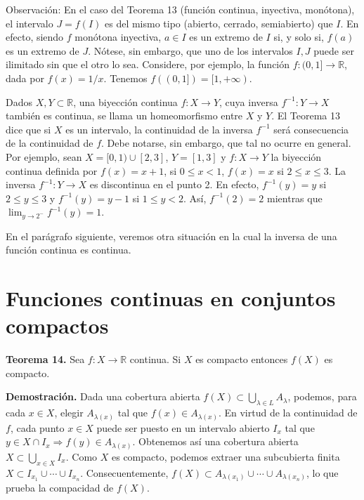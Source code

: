 \documentclass[12pt,oneside]{book}
\begin{document}
Observación: En el caso del Teorema 13 (función continua, inyectiva, monótona), el intervalo \( J = f(I) \) es del mismo tipo (abierto, cerrado, semiabierto) que \( I \). En efecto, siendo \( f \) monótona inyectiva, \( a \in I \) es un extremo de \( I \) si, y solo si, \( f(a) \) es un extremo de \( J \). Nótese, sin embargo, que uno de los intervalos \( I, J \) puede ser ilimitado sin que el otro lo sea. Considere, por ejemplo, la función \( f: (0, 1] \to \mathbb{R} \), dada por \( f(x) = 1/x \). Tenemos \( f((0, 1]) = [1, +\infty) \).

Dados \( X, Y \subset \mathbb{R} \), una biyección continua \( f: X \to Y \), cuya inversa \( f^{-1}: Y \to X \) también es continua, se llama un homeomorfismo entre \( X \) y \( Y \). El Teorema 13 dice que si \( X \) es un intervalo, la continuidad de la inversa \( f^{-1} \) será consecuencia de la continuidad de \( f \). Debe notarse, sin embargo, que tal no ocurre en general. Por ejemplo, sean \( X = [0, 1) \cup [2, 3] \), \( Y = [1, 3] \) y \( f: X \to Y \) la biyección continua definida por \( f(x) = x + 1 \), si \( 0 \leq x < 1 \), \( f(x) = x \) si \( 2 \leq x \leq 3 \). La inversa \( f^{-1}: Y \to X \) es discontinua en el punto 2. En efecto, \( f^{-1}(y) = y \) si \( 2 \leq y \leq 3 \) y \( f^{-1}(y) = y - 1 \) si \( 1 \leq y < 2 \). Así, \( f^{-1}(2) = 2 \) mientras que \( \lim_{y \to 2^-} f^{-1}(y) = 1 \).

En el parágrafo siguiente, veremos otra situación en la cual la inversa de una función continua es continua.

\section{Funciones continuas en conjuntos compactos}

\textbf{Teorema 14.} Sea \( f: X \to \mathbb{R} \) continua. Si \( X \) es compacto entonces \( f(X) \) es compacto.

\textbf{Demostración.} Dada una cobertura abierta \( f(X) \subset \bigcup_{\lambda \in L} A_{\lambda} \), podemos, para cada \( x \in X \), elegir \( A_{\lambda(x)} \) tal que \( f(x) \in A_{\lambda(x)} \). En virtud de la continuidad de \( f \), cada punto \( x \in X \) puede ser puesto en un intervalo abierto \( I_x \) tal que \( y \in X \cap I_x \Rightarrow f(y) \in A_{\lambda(x)} \). Obtenemos así una cobertura abierta \( X \subset \bigcup_{x \in X} I_x \). Como \( X \) es compacto, podemos extraer una subcubierta finita \( X \subset I_{x_1} \cup \cdots \cup I_{x_n} \). Consecuentemente, \( f(X) \subset A_{\lambda(x_1)} \cup \cdots \cup A_{\lambda(x_n)} \), lo que prueba la compacidad de \( f(X) \).
\end{document}
